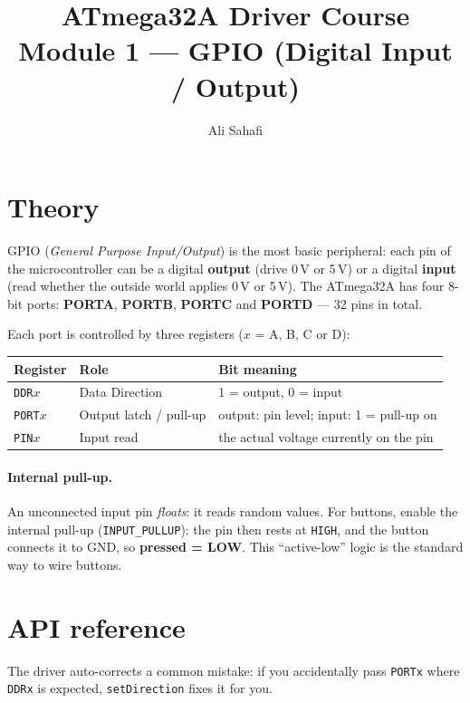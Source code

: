 \documentclass[11pt,a4paper]{article}
\title{ATmega32A Driver Course \\ \Large Module 1 --- GPIO (Digital Input / Output)}
\author{Ali Sahafi}
\date{}
\begin{document}
\maketitle

\section{Theory}

GPIO (\emph{General Purpose Input/Output}) is the most basic peripheral: each
pin of the microcontroller can be a digital \textbf{output} (drive 0\,V or
5\,V) or a digital \textbf{input} (read whether the outside world applies
0\,V or 5\,V). The ATmega32A has four 8-bit ports: \textbf{PORTA},
\textbf{PORTB}, \textbf{PORTC} and \textbf{PORTD} --- 32 pins in total.

Each port is controlled by three registers ($x$ = A, B, C or D):

\begin{center}
\begin{tabular}{lll}
\toprule
\textbf{Register} & \textbf{Role} & \textbf{Bit meaning} \\
\midrule
\texttt{DDR$x$}  & Data Direction & 1 = output, 0 = input \\
\texttt{PORT$x$} & Output latch / pull-up & output: pin level; input: 1 = pull-up on \\
\texttt{PIN$x$}  & Input read & the actual voltage currently on the pin \\
\bottomrule
\end{tabular}
\end{center}

\paragraph{Internal pull-up.} An unconnected input pin \emph{floats}: it reads
random values. For buttons, enable the internal pull-up
(\texttt{INPUT\_PULLUP}): the pin then rests at \texttt{HIGH}, and the button
connects it to GND, so \textbf{pressed = LOW}. This ``active-low'' logic is
the standard way to wire buttons.

\section{API reference}

The driver auto-corrects a common mistake: if you accidentally pass
\texttt{PORTx} where \texttt{DDRx} is expected, \texttt{setDirection} fixes
it for you.
\end{document}
